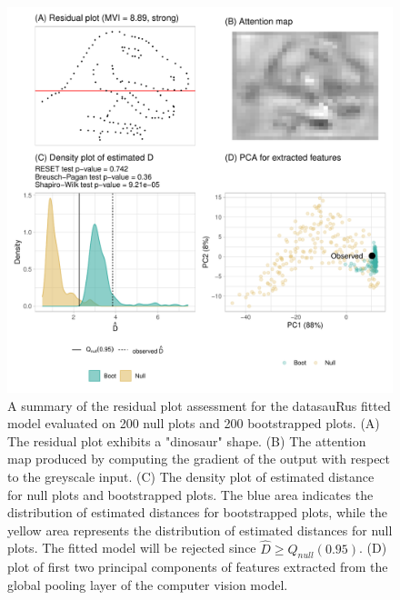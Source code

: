 \documentclass[]{interact}
\theoremstyle{plain}%
\theoremstyle{definition}
\theoremstyle{remark}
\begin{document}
\begin{figure}[!h]

{\centering \includegraphics[width=1\linewidth]{paper_files/figure-latex/dino-check-1} 

}

\caption{A summary of the residual plot assessment for the datasauRus fitted model evaluated on 200 null plots and 200 bootstrapped plots. (A) The residual plot exhibits a "dinosaur" shape. (B) The attention map produced by computing the gradient of the output with respect to the greyscale input.  (C) The density plot of estimated distance for null plots and bootstrapped plots. The blue area indicates the distribution of estimated distances for bootstrapped plots, while the yellow area represents the distribution of estimated distances for null plots. The fitted model will be rejected since $\hat{D} \geq Q_{null}(0.95)$. (D) plot of first two principal components of features extracted from the global pooling layer of the computer vision model.}\label{fig:dino-check}
\end{figure}
\end{document}
